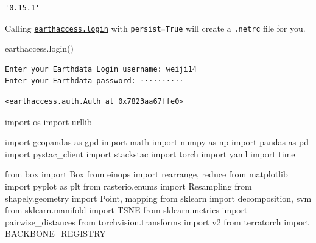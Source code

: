 \documentclass[
  letterpaper,
  DIV=11,
  numbers=noendperiod]{scrreprt}
\newenvironment{Shaded}{\begin{snugshade}}{\end{snugshade}}
\newcommand{\BuiltInTok}[1]{\textcolor[rgb]{0.00,0.23,0.31}{#1}}
\newcommand{\ImportTok}[1]{\textcolor[rgb]{0.00,0.46,0.62}{#1}}
\newcommand{\NormalTok}[1]{\textcolor[rgb]{0.00,0.23,0.31}{#1}}
\begin{document}
\begin{verbatim}
'0.15.1'
\end{verbatim}

Calling
\href{https://earthaccess.readthedocs.io/en/stable/howto/authenticate/}{\texttt{earthaccess.login}}
with \texttt{persist=True} will create a \texttt{.netrc} file for you.

\begin{Shaded}
\begin{Highlighting}[]
\NormalTok{earthaccess.login()}
\end{Highlighting}
\end{Shaded}

\begin{verbatim}
Enter your Earthdata Login username: weiji14
Enter your Earthdata password: ··········
\end{verbatim}

\begin{verbatim}
<earthaccess.auth.Auth at 0x7823aa67ffe0>
\end{verbatim}

\begin{Shaded}
\begin{Highlighting}[]
\ImportTok{import}\NormalTok{ os}
\ImportTok{import}\NormalTok{ urllib}

\ImportTok{import}\NormalTok{ geopandas }\ImportTok{as}\NormalTok{ gpd}
\ImportTok{import}\NormalTok{ math}
\ImportTok{import}\NormalTok{ numpy }\ImportTok{as}\NormalTok{ np}
\ImportTok{import}\NormalTok{ pandas }\ImportTok{as}\NormalTok{ pd}
\ImportTok{import}\NormalTok{ pystac\_client}
\ImportTok{import}\NormalTok{ stackstac}
\ImportTok{import}\NormalTok{ torch}
\ImportTok{import}\NormalTok{ yaml}
\ImportTok{import}\NormalTok{ time}

\ImportTok{from}\NormalTok{ box }\ImportTok{import}\NormalTok{ Box}
\ImportTok{from}\NormalTok{ einops }\ImportTok{import}\NormalTok{ rearrange, }\BuiltInTok{reduce}
\ImportTok{from}\NormalTok{ matplotlib }\ImportTok{import}\NormalTok{ pyplot }\ImportTok{as}\NormalTok{ plt}
\ImportTok{from}\NormalTok{ rasterio.enums }\ImportTok{import}\NormalTok{ Resampling}
\ImportTok{from}\NormalTok{ shapely.geometry }\ImportTok{import}\NormalTok{ Point, mapping}
\ImportTok{from}\NormalTok{ sklearn }\ImportTok{import}\NormalTok{ decomposition, svm}
\ImportTok{from}\NormalTok{ sklearn.manifold }\ImportTok{import}\NormalTok{ TSNE}
\ImportTok{from}\NormalTok{ sklearn.metrics }\ImportTok{import}\NormalTok{ pairwise\_distances}
\ImportTok{from}\NormalTok{ torchvision.transforms }\ImportTok{import}\NormalTok{ v2}
\ImportTok{from}\NormalTok{ terratorch }\ImportTok{import}\NormalTok{ BACKBONE\_REGISTRY}
\end{Highlighting}
\end{Shaded}
\end{document}
